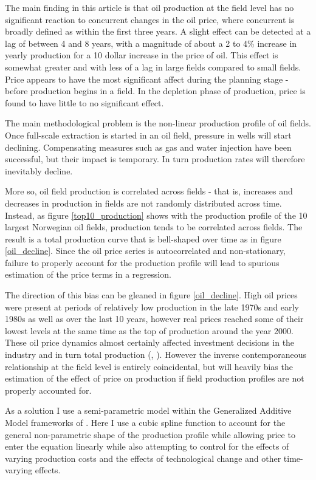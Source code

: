 \documentclass[11pt]{article}
\begin{document}
The main finding in this article is that oil production at the field level has no significant reaction to concurrent changes in the oil price, where concurrent is broadly defined as within the first three years.  A slight effect can be detected at a lag of between 4 and 8 years, with a magnitude of about a 2 to 4\% increase in yearly production for a 10 dollar increase in the price of oil.  This effect is somewhat greater and with less of a lag in large fields compared to small fields.  Price appears to have the most significant affect during the planning stage - before production begins in a field.  In the depletion phase of production, price is found to have little to no significant effect.  

The main methodological problem is the non-linear production profile of oil fields.  Once full-scale extraction is started in an oil field, pressure in wells will start declining. Compensating measures such as gas and water injection have been successful, but their impact is temporary. In turn production rates will therefore inevitably decline.

More so, oil field production is correlated across fields - that is, increases and decreases in production in fields are not randomly distributed across time.  Instead, as figure \ref{top10_production} shows with the production profile of the 10 largest Norwegian oil fields, production tends to be correlated across fields.  The result is a total production curve that is bell-shaped over time as in figure \ref{oil_decline}.  Since the oil price series is autocorrelated and non-stationary, failure to properly account for the production profile will lead to spurious estimation of the price terms in a regression.

The direction of this bias can be gleaned in figure \ref{oil_decline}.  High oil prices were present at periods of relatively low production in the late 1970s and early 1980s as well as over the last 10 years, however real prices reached some of their lowest levels at the same time as the top of production around the year 2000. These oil price dynamics almost certainly affected investment decisions in the industry and in turn total production (\citep{osmundsen_is_2007}, \citep{aune_financial_2010}). However the inverse contemporaneous relationship at the field level is entirely coincidental, but will heavily bias the estimation of the effect of price on production if field production profiles are not properly accounted for. 

As a solution I use a semi-parametric model within the Generalized Additive Model frameworks of \cite{hastie_generalized_1990}.  Here I use a cubic spline function to account for the general non-parametric shape of the production profile while allowing price to enter the equation linearly while also attempting to control for the effects of varying production costs and the effects of technological change and other time-varying effects.  
\end{document}

